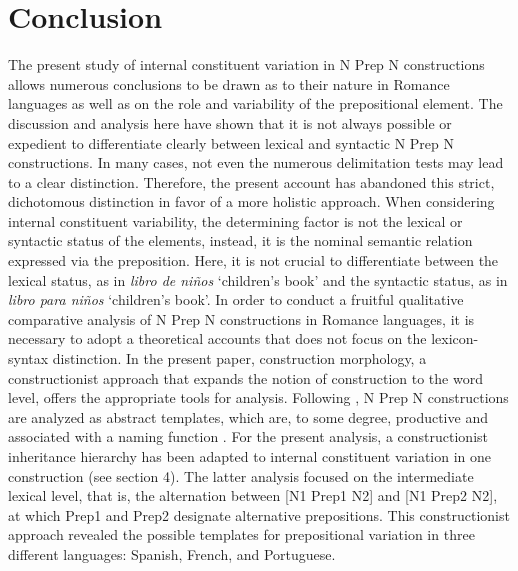 \documentclass[output=paper]{langsci/langscibook}
\begin{document}
\section{Conclusion}

The present study of internal constituent variation in N Prep N constructions allows numerous conclusions to be drawn as to their nature in Romance languages as well as on the role and variability of the prepositional element. The discussion and analysis here have shown that it is not always possible or expedient to differentiate clearly between lexical and syntactic N Prep N constructions. In many cases, not even the numerous delimitation tests may lead to a clear distinction. Therefore, the present account has abandoned this strict, dichotomous distinction in favor of a more holistic approach. When considering internal constituent variability, the determining factor is not the lexical or syntactic status of the elements, instead, it is the nominal semantic relation expressed via the preposition. Here, it is not crucial to differentiate between the lexical status, as in \textit{libro de niños }`children’s book' and the syntactic status, as in \textit{libro para niños} `children’s book'. In order to conduct a fruitful qualitative comparative analysis of N Prep N constructions in Romance languages, it is necessary to adopt a theoretical accounts that does not focus on the lexicon-syntax distinction. In the present paper, construction morphology, a constructionist approach that expands the notion of construction to the word level, offers the appropriate tools for analysis. Following \citet{Masini:2009}, N Prep N constructions are analyzed as abstract templates, which are, to some degree, productive and associated with a naming function  \citep [261]{Masini:2009}. For the present analysis, a constructionist inheritance hierarchy has been adapted to internal constituent variation in one construction (see section 4). The latter analysis focused on the intermediate lexical level, that is, the alternation between [N1 Prep1 N2] and [N1 Prep2 N2], at which Prep1 and Prep2 designate alternative prepositions. This constructionist approach revealed the possible templates for prepositional variation in three different languages: Spanish, French, and Portuguese. 
\end{document}
